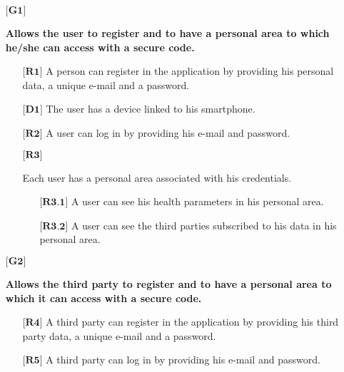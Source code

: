 \vspace{0.3cm}

\begin{itemize}

	\item[${\textbf{[G1]}}$] {\textbf{Allows the user to register and to have a personal area to which he/she can access with a secure code.}
		\begin{itemize}
			\item[$\textbf{[R1]}$] {A person can register in the application by providing his personal data, a unique e-mail and a password.}
			\item[$\textbf{[D1]}$] {The user has a device linked to his smartphone.}
			\item[$\textbf{[R2]}$] {A user can log in by providing his e-mail and password.}
			\item[$\textbf{[R3]}$] {Each user has a personal area associated with his credentials.
				\begin{itemize}
					\item[$\textbf{[R3.1]}$] {A user can see his health parameters in his personal area.}
					\item[$\textbf{[R3.2]}$] {A user can see the third parties subscribed to his data in his personal area.}
				\end{itemize}}
		\end{itemize}}


	\item[${\textbf{[G2]}}$] {\textbf{Allows the third party to register and to have a personal area to which it can access with a secure code.}
		\begin{itemize}
			\item[$\textbf{[R4]}$] {A third party can register in the application by providing his third party data, a unique e-mail and a password.}
			\item[$\textbf{[R5]}$] {A third party can log in by providing his e-mail and password.}
		\end{itemize}}



\end{itemize}
